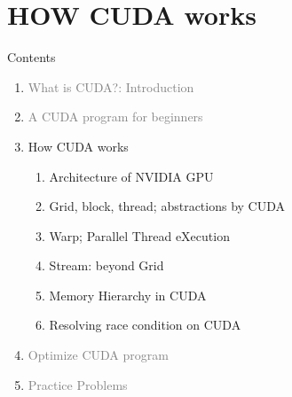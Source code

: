 \documentclass[dvipdfmx, 11pt, aspectratio=169]{beamer}   %
\begin{document}
        
\section{HOW CUDA works}
\begin{frame}{Contents}
  \begin{enumerate}%
    \item \textcolor{gray}{What is CUDA?: Introduction}
    \item \textcolor{gray}{A CUDA program for beginners}
    \item How CUDA works
    \begin{enumerate}
      \item Architecture of NVIDIA GPU
      \item Grid, block, thread; abstractions by CUDA
      \item Warp; Parallel Thread eXecution
      \item Stream: beyond Grid
      \item Memory Hierarchy in CUDA
      \item Resolving race condition on CUDA
    \end{enumerate}
    \item \textcolor{gray}{Optimize CUDA program}
    \item \textcolor{gray}{Practice Problems}
  \end{enumerate}
\end{frame}
\end{document}
